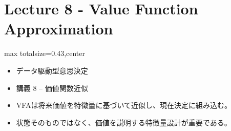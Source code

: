 \section*{Lecture 8 - Value Function Approximation}

\clearpage
{}
\begin{minipage}[t]{0.405\textwidth}
\begin{adjustbox}{max totalsize={\textwidth}{0.43\textheight},center}
\begin{minipage}{\textwidth}\scriptsize
{}\begin{itemize}
\item データ駆動型意思決定
\item 講義 8 – 価値関数近似
\end{itemize}\begin{itemize}
\item VFAは将来価値を特徴量に基づいて近似し、現在決定に組み込む。
\item 状態そのものではなく、価値を説明する特徴量設計が重要である。
\end{itemize}
\end{minipage}
\end{adjustbox}
\end{minipage}\hfill
